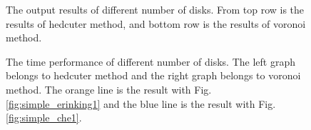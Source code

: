 \documentclass[11pt]{article}
\begin{document}
\begin{figure}[hbt]
{    \label{fig:squirrel_2500-v}
  }\hspace{-3mm}
  \hspace{-3mm}
    \caption{The output results of different number of disks. From top row is the results of hedcuter method, and bottom row is the results of voronoi method. \label{fig:cat_numdisks}}
\end{figure}
\begin{figure}[hbt]
 \centering
 \hspace{-3mm}
    \caption{The time performance of different number of disks. The left graph belongs to hedcuter method and the right graph belongs to voronoi method. The orange line is the result with Fig. \ref{fig:simple_erinking1} and the blue line is the result with Fig. \ref{fig:simple_che1}. \label{fig:num_time}}
\end{figure}
\end{document}

